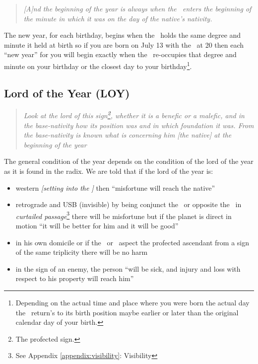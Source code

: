 \begin{quote}
\textsl{[A]nd the beginning of the year is always when the \Sun\, enters the beginning of the minute in which it was on the day of the native's nativity.}
\end{quote}

The new year, for each birthday, begins when the \Sun\, holds the same degree and minute it held at birth so if you are born on July 13 with the \Sun\, at 20 then each ``new year'' for you will begin exactly when the \Sun\, re-occupies that degree and minute on your birthday or the closest day to your birthday\footnote{Depending on the actual time and place where you were born the actual day the \Sun\, return's to its birth position maybe earlier or later than the original calendar day of your birth.}.

\subsection{Lord of the Year (LOY)}
\begin{quote}
\textsl{Look at the lord of this sign\footnote{The profected sign.}, whether it is a benefic or a malefic, and in the base-nativity how its position was and in which foundation it was. From the base-nativity is known what is concerning him [the native] at the beginning of the year}
\end{quote}

The general condition of the year depends on the condition of the lord of the year as it is found in the radix. We are told that if the lord of the year is:
\begin{itemize}[topsep=0em,itemsep=0em]
\item {}western \textsl{[setting into the \Sun]} then ``misfortune will reach the native''

\item {}retrograde and USB (invisible) by being conjunct the \Sun\, or opposite the \Sun\, in \textsl{curtailed passage}\footnote{See Appendix \ref{appendix:visibility}{: Visibility}} there will be misfortune but if the planet is direct in motion ``it will be better for him and it will be good''

\item {}in his own domicile or if the \Sun\, or \Moon\, aspect the profected ascendant from a sign of the same triplicity there will be no harm

\item {}in the sign of an enemy, the person ``will be sick, and injury and loss with respect to his property will reach him''
\end{itemize}

